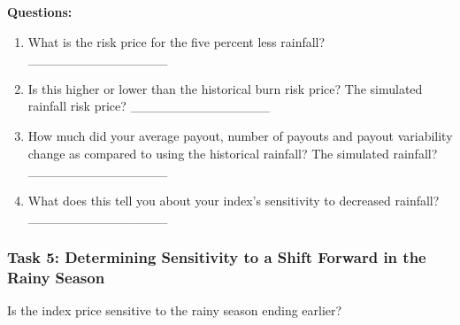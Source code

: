 \documentclass[letterpaper,10pt,english]{sphinxmanual}
\begin{document}
\textbf{Questions:}
\begin{enumerate}
\item {} 
What is the risk price for the five percent less rainfall? \_\_\_\_\_\_\_\_\_\_\_\_\_\_\_

\item {} 
Is this higher or lower than the historical burn risk price? The simulated rainfall risk price? \_\_\_\_\_\_\_\_\_\_\_\_\_\_\_

\item {} 
How much did your average payout, number of payouts and payout variability change as compared to using the historical rainfall?  The simulated rainfall? \_\_\_\_\_\_\_\_\_\_\_\_\_\_\_

\item {} 
What does this tell you about your index's sensitivity to decreased rainfall? \_\_\_\_\_\_\_\_\_\_\_\_\_\_\_

\end{enumerate}


\subsubsection{Task 5: Determining Sensitivity to a Shift Forward in the Rainy Season}
\label{wiiet/wiiet_initialtomarketpricing_Web:task-5-determining-sensitivity-to-a-shift-forward-in-the-rainy-season}
Is the index price sensitive to the rainy season ending earlier?
\end{document}
